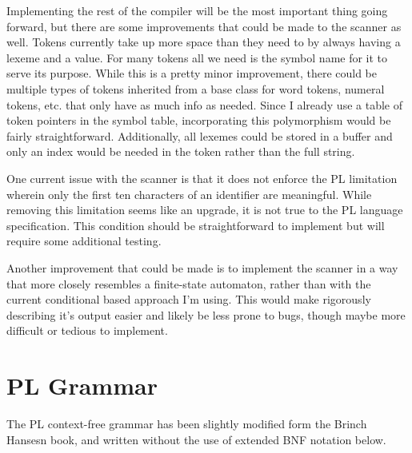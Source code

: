 \documentclass{article}
\begin{document}
        Implementing the rest of the compiler will be the most important thing going forward, but there are some improvements that could be made to the scanner as well. Tokens currently take up more space than they need to by always having a lexeme and a value. For many tokens all we need is the symbol name for it to serve its purpose. While this is a pretty minor improvement, there could be multiple types of tokens inherited from a base class for word tokens, numeral tokens, etc. that only have as much info as needed. Since I already use a table of token pointers in the symbol table, incorporating this polymorphism would be fairly straightforward. Additionally, all lexemes could be stored in a buffer and only an index would be needed in the token rather than the full string.

        One current issue with the scanner is that it does not enforce the PL limitation wherein only the first ten characters of an identifier are meaningful. While removing this limitation seems like an upgrade, it is not true to the PL language specification. This condition should be straightforward to implement but will require some additional testing.

        Another improvement that could be made is to implement the scanner in a way that more closely resembles a finite-state automaton, rather than with the current conditional based approach I'm using. This would make rigorously describing it's output easier and likely be less prone to bugs, though maybe more difficult or tedious to implement.


    \pagebreak
    \section{PL Grammar}
    The PL context-free grammar has been slightly modified form the Brinch Hansesn book, and written without the use of extended BNF notation below.
\end{document}
